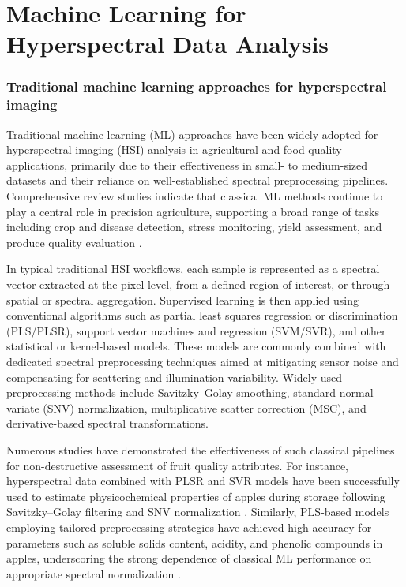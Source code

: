 \section{Machine Learning for Hyperspectral Data Analysis}
\label{sec:ml_hsi}

\subsubsection{Traditional machine learning approaches for hyperspectral imaging}
\label{subsec:traditional_ml_hsi}

\noindent
Traditional machine learning (ML) approaches have been widely adopted for hyperspectral imaging (HSI) analysis in agricultural and food-quality applications, primarily due to their effectiveness in small- to medium-sized datasets and their reliance on well-established spectral preprocessing pipelines. Comprehensive review studies indicate that classical ML methods continue to play a central role in precision agriculture, supporting a broad range of tasks including crop and disease detection, stress monitoring, yield assessment, and produce quality evaluation \cite{RAM2024109037, su16146064}.

\medskip
\noindent
In typical traditional HSI workflows, each sample is represented as a spectral vector extracted at the pixel level, from a defined region of interest, or through spatial or spectral aggregation. Supervised learning is then applied using conventional algorithms such as partial least squares regression or discrimination (PLS/PLSR), support vector machines and regression (SVM/SVR), and other statistical or kernel-based models. These models are commonly combined with dedicated spectral preprocessing techniques aimed at mitigating sensor noise and compensating for scattering and illumination variability. Widely used preprocessing methods include Savitzky--Golay smoothing, standard normal variate (SNV) normalization, multiplicative scatter correction (MSC), and derivative-based spectral transformations.

\medskip
\noindent
Numerous studies have demonstrated the effectiveness of such classical pipelines for non-destructive assessment of fruit quality attributes. For instance, hyperspectral data combined with PLSR and SVR models have been successfully used to estimate physicochemical properties of apples during storage following Savitzky--Golay filtering and SNV normalization \cite{agriculture13051086}. Similarly, PLS-based models employing tailored preprocessing strategies have achieved high accuracy for parameters such as soluble solids content, acidity, and phenolic compounds in apples, underscoring the strong dependence of classical ML performance on appropriate spectral normalization \cite{horticulturae8070598}.


